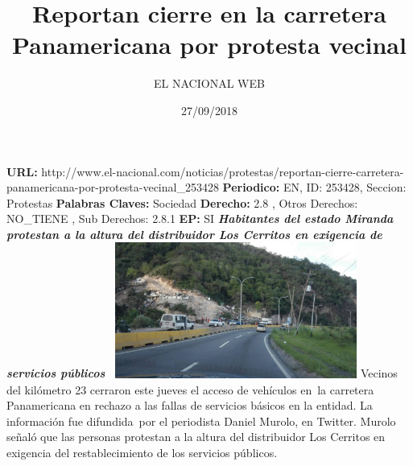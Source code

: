 \documentclass{article}%
\title{\textbf{Reportan cierre en la carretera Panamericana por protesta vecinal}}%
\author{EL NACIONAL WEB}%
\date{27/09/2018}%
\begin{document}
%
\normalsize%
\maketitle%
\textbf{URL: }%
http://www.el{-}nacional.com/noticias/protestas/reportan{-}cierre{-}carretera{-}panamericana{-}por{-}protesta{-}vecinal\_253428\newline%
%
\textbf{Periodico: }%
EN, %
ID: %
253428, %
Seccion: %
Protestas\newline%
%
\textbf{Palabras Claves: }%
Sociedad\newline%
%
\textbf{Derecho: }%
2.8%
, Otros Derechos: %
NO\_TIENE%
, Sub Derechos: %
2.8.1%
\newline%
%
\textbf{EP: }%
SI\newline%
\newline%
%
\textbf{\textit{Habitantes del estado Miranda protestan a la altura del distribuidor Los Cerritos en exigencia de servicios públicos~}}%
\newline%
\newline%
%
\includegraphics[width=300px]{13.jpg}%
\newline%
%
Vecinos del kilómetro 23 cerraron este jueves el acceso de vehículos en~la carretera Panamericana en rechazo a las fallas de servicios básicos en la entidad.%
\newline%
%
La información fue difundida~por el periodista Daniel Murolo, en Twitter.%
\newline%
%
Murolo señaló que las personas protestan a la altura del distribuidor Los Cerritos en exigencia del restablecimiento de los servicios públicos.%
\newline%
%
\end{document}
